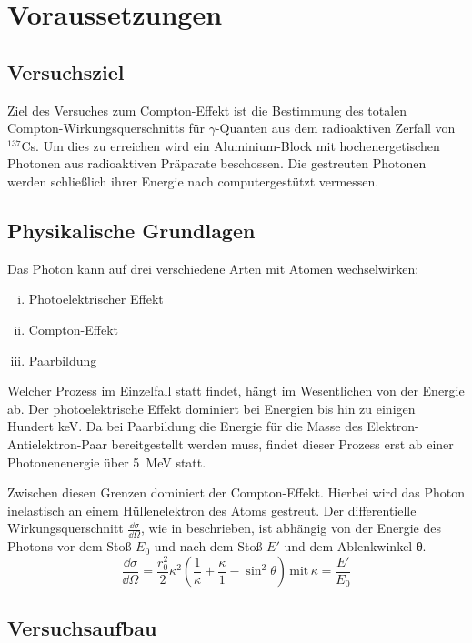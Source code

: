 \section{Voraussetzungen}

\subsection{Versuchsziel}

Ziel des Versuches zum Compton-Effekt ist die Bestimmung des totalen
Compton-Wirkungsquerschnitts für $\gamma$-Quanten aus dem radioaktiven
Zerfall von  $^{137}$Cs. Um dies zu erreichen wird ein
Aluminium-Block mit hochenergetischen Photonen aus radioaktiven Präparate
beschossen. Die gestreuten Photonen werden schließlich ihrer Energie nach
computergestützt vermessen.

\subsection{Physikalische Grundlagen}

Das Photon kann auf drei verschiedene Arten mit Atomen wechselwirken:
\begin{enumerate}[i)]
  \item Photoelektrischer Effekt
  \item Compton-Effekt
  \item Paarbildung
\end{enumerate}
Welcher Prozess im Einzelfall statt findet, hängt im Wesentlichen von der
Energie ab. Der photoelektrische Effekt dominiert bei Energien bis hin zu
einigen Hundert \si{\kilo\eV}. Da bei Paarbildung die Energie für die Masse des
Elektron-Antielektron-Paar bereitgestellt werden muss, findet dieser Prozess
erst ab einer Photonenenergie über \SI{5}{\mega\eV} statt.

Zwischen diesen Grenzen dominiert der Compton-Effekt. Hierbei wird das Photon
inelastisch an einem Hüllenelektron des Atoms gestreut. Der differentielle
Wirkungsquerschnitt $\frac{\dd{σ}}{\dd{\Omega}}$, wie in \cite[Gl. 1]{script}
beschrieben, ist abhängig von der Energie des Photons vor dem Stoß $E_0$ und
nach dem Stoß $E'$ und dem Ablenkwinkel θ.
\begin{equation}
  \frac{\dd{σ}}{\dd{\Omega}} = \frac{r_0^2}{2}κ^2\left(\frac{1}{κ}+\frac{κ}{1}-\sin^2\theta\right)
  \,
  \mathrm{mit}
  \,
  κ = \frac{E'}{E_0}
  \label{eqn:diff_sigma}
\end{equation}

\subsection{Versuchsaufbau}

